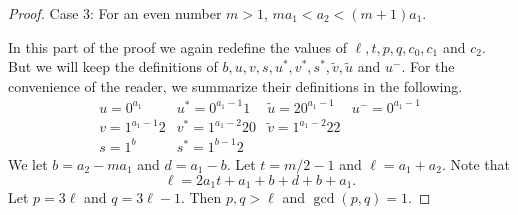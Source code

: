 \documentclass[11pt]{amsart}
\theoremstyle{definition}
\begin{document}
\begin{proof}
   
Case 3: For an even number $m>1$, $ma_1<a_2<(m+1)a_1$. 

In this part of the proof we again redefine the values of $\ell, t, p, q, c_0, c_1$ and $c_2$. But we will keep the definitions of $b, u, v, s, u^*, v^*, s^*, \tilde{v}, \tilde{u}$ and $u^{-}$. For the convenience of the reader, we summarize their definitions in the following.
$$\begin{array}{llll}
u=0^{a_1} & u^*=0^{a_1-1}1 & \tilde{u}=20^{a_1-1} & u^-=0^{a_1-1}\\
v=1^{a_1-1}2 & v^*=1^{a_1-2}20 & \tilde{v}=1^{a_1-2}22 & \\
s=1^b & s^*=1^{b-1}2 & & 
\end{array}
$$
We let $b=a_2-ma_1$ and $d=a_1-b$. Let $t=m/2-1$ and $\ell=a_1+a_2$. Note that
$$\ell=2a_1t+a_1+b+d+b+a_1.$$
Let $p=3\ell$ and $q=3\ell-1$. Then $p, q>\ell$ and $\gcd(p,q)=1$. 


\end{proof}
\end{document}
